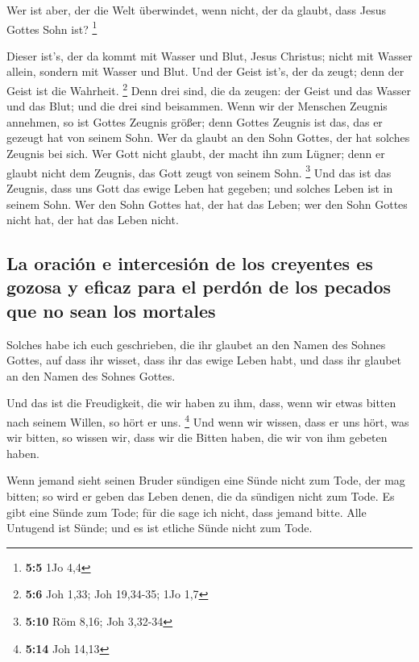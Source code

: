  Wer ist aber, der die Welt überwindet, wenn nicht, der da
glaubt, dass Jesus Gottes Sohn ist? \footnote{\textbf{5:5} 1Jo 4,4}

 Dieser ist's, der da kommt mit Wasser und Blut, Jesus
Christus; nicht mit Wasser allein, sondern mit Wasser und Blut. Und der
Geist ist's, der da zeugt; denn der Geist ist die Wahrheit. \footnote{\textbf{5:6}
  Joh 1,33; Joh 19,34-35; 1Jo 1,7}  Denn drei sind, die da
zeugen: der Geist und das Wasser und das Blut;  und die
drei sind beisammen.  Wenn wir der Menschen Zeugnis
annehmen, so ist Gottes Zeugnis größer; denn Gottes Zeugnis ist das, das
er gezeugt hat von seinem Sohn.  Wer da glaubt an den
Sohn Gottes, der hat solches Zeugnis bei sich. Wer Gott nicht glaubt,
der macht ihn zum Lügner; denn er glaubt nicht dem Zeugnis, das Gott
zeugt von seinem Sohn. \footnote{\textbf{5:10} Röm 8,16; Joh 3,32-34}
 Und das ist das Zeugnis, dass uns Gott das ewige Leben
hat gegeben; und solches Leben ist in seinem Sohn.  Wer
den Sohn Gottes hat, der hat das Leben; wer den Sohn Gottes nicht hat,
der hat das Leben nicht.

\hypertarget{la-oraciuxf3n-e-intercesiuxf3n-de-los-creyentes-es-gozosa-y-eficaz-para-el-perduxf3n-de-los-pecados-que-no-sean-los-mortales}{%
\subsection{La oración e intercesión de los creyentes es gozosa y eficaz
para el perdón de los pecados que no sean los
mortales}\label{la-oraciuxf3n-e-intercesiuxf3n-de-los-creyentes-es-gozosa-y-eficaz-para-el-perduxf3n-de-los-pecados-que-no-sean-los-mortales}}

 Solches habe ich euch geschrieben, die ihr glaubet an
den Namen des Sohnes Gottes, auf dass ihr wisset, dass ihr das ewige
Leben habt, und dass ihr glaubet an den Namen des Sohnes Gottes.

 Und das ist die Freudigkeit, die wir haben zu ihm, dass,
wenn wir etwas bitten nach seinem Willen, so hört er uns. \footnote{\textbf{5:14}
  Joh 14,13}  Und wenn wir wissen, dass er uns hört, was
wir bitten, so wissen wir, dass wir die Bitten haben, die wir von ihm
gebeten haben.

 Wenn jemand sieht seinen Bruder sündigen eine Sünde
nicht zum Tode, der mag bitten; so wird er geben das Leben denen, die da
sündigen nicht zum Tode. Es gibt eine Sünde zum Tode; für die sage ich
nicht, dass jemand bitte.  Alle Untugend ist Sünde; und
es ist etliche Sünde nicht zum Tode.

